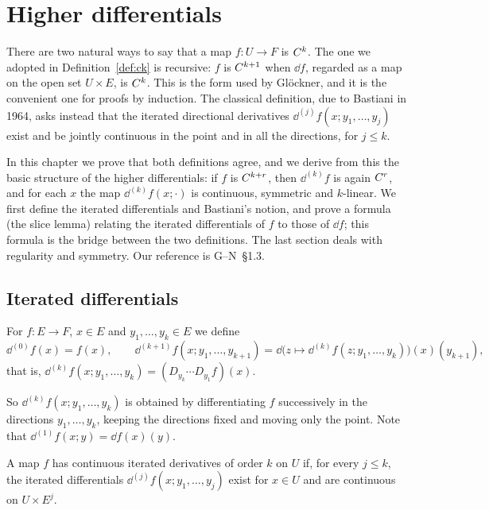 \chapter{Higher differentials}
\label{chap:higher}

There are two natural ways to say that a map $f \colon U \to F$ is $C^{k}$. The one we adopted
in Definition~\ref{def:ck} is recursive: $f$ is $C^{k+1}$ when $\dd f$, regarded as a map on the
open set $U \times E$, is $C^{k}$. This is the form used by Glöckner, and it is the convenient
one for proofs by induction. The classical definition, due to Bastiani \cite{Bas64} in 1964,
asks instead that the iterated directional derivatives $\dd^{(j)} f(x; y_1, \dots, y_j)$ exist
and be jointly continuous in the point and in all the directions, for $j \leq k$.

In this chapter we prove that both definitions agree, and we derive from this the basic
structure of the higher differentials: if $f$ is $C^{k+r}$, then $\dd^{(k)} f$ is again
$C^{r}$, and for each $x$ the map $\dd^{(k)} f(x; \cdot)$ is continuous, symmetric and
$k$-linear. We first define the iterated differentials and Bastiani's notion, and prove a
formula (the slice lemma) relating the iterated differentials of $f$ to those of $\dd f$; this
formula is the bridge between the two definitions. The last section deals with regularity and
symmetry. Our reference is G--N~\S1.3.

\section{Iterated differentials}

\begin{definition}
  \label{def:iterated}
  \leanok
  For $f \colon E \to F$, $x \in E$ and $y_1, \dots, y_k \in E$ we define
  \[
    \dd^{(0)} f(x) = f(x), \qquad
    \dd^{(k+1)} f(x; y_1, \dots, y_{k+1})
      = \dd\bigl(z \mapsto \dd^{(k)} f(z; y_1, \dots, y_k)\bigr)(x)(y_{k+1}),
  \]
  that is, $\dd^{(k)} f(x; y_1, \dots, y_k) = (D_{y_k} \cdots D_{y_1} f)(x)$.
\end{definition}

So $\dd^{(k)} f(x; y_1, \dots, y_k)$ is obtained by differentiating $f$ successively in the
directions $y_1, \dots, y_k$, keeping the directions fixed and moving only the point. Note that
$\dd^{(1)} f(x; y) = \dd f(x)(y)$.

\begin{definition}
  \label{def:bastiani}
  \leanok
  A map $f$ has continuous iterated derivatives of order $k$ on $U$ if, for every $j \leq k$,
  the iterated differentials $\dd^{(j)} f(x; y_1, \dots, y_j)$ exist for $x \in U$ and are
  continuous on $U \times E^j$.
\end{definition}


